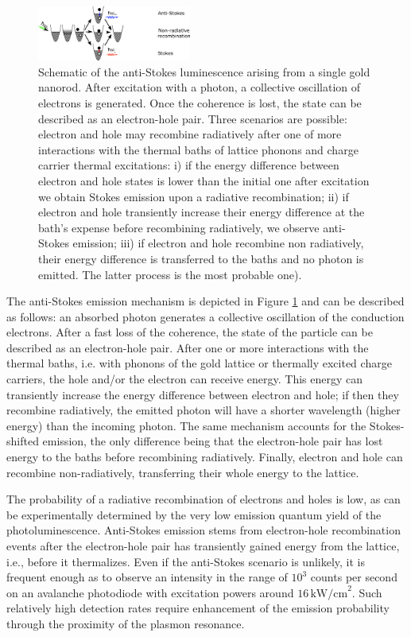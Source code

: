 \documentclass[journal=nalefd,manuscript=letter]{achemso}
\newcommand{\pwr}{\ensuremath{\,\textrm{kW/cm}^2}}
\begin{document}
\begin{figure}[htp]
\centering
	\includegraphics[width=0.45\textwidth]{Figures/02_Scheme/luminescence_all_AS.png}
	\caption{Schematic of the anti-Stokes luminescence arising from a single gold
	nanorod. After excitation with a photon, a collective oscillation of electrons
	is generated. Once the coherence is lost, the state can be described as an
	electron-hole pair. Three scenarios are possible: electron and hole
	may recombine radiatively after one of more interactions with the thermal baths of lattice phonons and charge carrier thermal excitations: i) if the energy difference between electron and hole states is lower than the initial one after excitation we obtain Stokes emission upon a radiative recombination; ii) if electron and hole transiently increase their energy difference at the bath's expense before recombining radiatively, we observe anti-Stokes emission; iii) if electron and hole recombine non radiatively, their energy difference is transferred to the baths and no photon is emitted. The latter process is the most probable one).}
	\label{fig:anti-Stokes-process}
\end{figure}

The anti-Stokes emission mechanism\cite{He2015} is depicted in Figure
\ref{fig:anti-Stokes-process} and can be described as follows: an absorbed
photon generates a collective oscillation of the conduction electrons. After a
fast loss of the coherence\cite{Sonnichsen2002}, the state of the particle can
be described as an electron-hole pair. After one or more interactions with the thermal
baths, i.e. with phonons of the gold lattice\cite{Lin2008} or thermally
excited charge carriers\cite{Sun1994}, the hole and/or the electron can
receive energy. This energy can transiently increase the energy difference between electron and
hole; if then they recombine radiatively, the emitted photon will have a shorter
wavelength (higher energy) than the incoming photon\cite{Huang2014}. The same
mechanism accounts for the Stokes-shifted emission, the only difference being
that the electron-hole pair has lost energy to the baths before recombining
radiatively. Finally, electron and hole can recombine
non-radiatively, transferring their whole energy to the lattice. 

The probability of a radiative recombination of electrons and holes is low,
as can be experimentally determined by the very low emission quantum yield of
the photoluminescence\cite{Yorulmaz2012}\cite{Rao2015}\cite{Sonnichsen2002}. Anti-Stokes
emission stems from electron-hole recombination events after the electron-hole
pair has transiently gained energy from the lattice, i.e., before it thermalizes. Even if the
anti-Stokes scenario is unlikely, it is frequent enough as to observe an
intensity in the range of $10^3$ counts per second on an avalanche photodiode
with excitation powers around $16\pwr$. Such relatively high detection rates
require enhancement of the emission probability through the proximity of the
plasmon resonance\cite{Neupane2013}.
\end{document}
